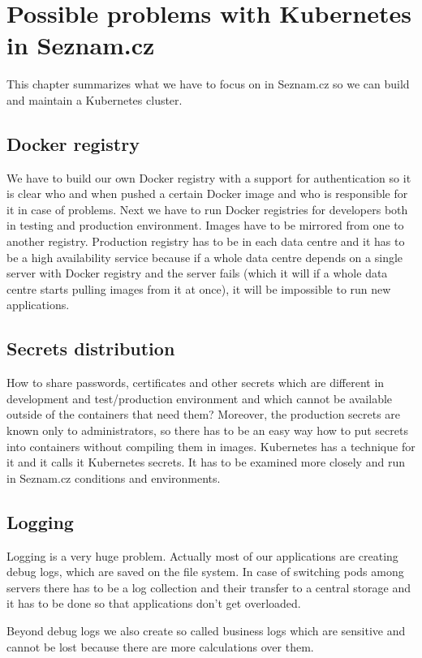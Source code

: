 \chapter{Possible problems with Kubernetes in Seznam.cz}

This chapter summarizes what we have to focus on in Seznam.cz so we can build and maintain a Kubernetes cluster.

\section{Docker registry}
We have to build our own Docker registry with a support for authentication so it is clear who and when pushed a certain Docker image and who is responsible for it in case of problems. Next we have to run Docker registries for developers both in testing and production environment. Images have to be mirrored from one to another registry. Production registry has to be in each data centre and it has to be a high availability service because if a whole data centre depends on a single server with Docker registry and the server fails (which it will if a whole data centre starts pulling images from it at once), it will be impossible to run new applications.

\section{Secrets distribution}
How to share passwords, certificates and other secrets which are different in development and test/production environment and which cannot be available outside of the containers that need them? Moreover, the production secrets are known only to administrators, so there has to be an easy way how to put secrets into containers without compiling them in images. Kubernetes has a technique for it and it calls it Kubernetes secrets. It has to be examined more closely and run in Seznam.cz conditions and environments.

\section{Logging}
Logging is a very huge problem. Actually most of our applications are creating debug logs, which are saved on the file system. In case of switching pods among servers there has to be a log collection and their transfer to a central storage and it has to be done so that applications don’t get overloaded.

Beyond debug logs we also create so called business logs which are sensitive and cannot be lost because there are more calculations over them.

